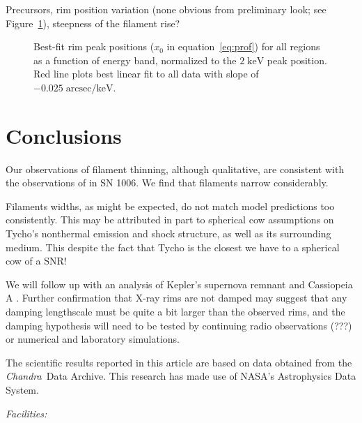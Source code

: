 \documentclass[iop, apj, numberedappendix, twocolappendix]{emulateapj}
\newcommand*{\mt}{\mathrm}
\newcommand*{\unit}[1]{\;\mt{#1}}  %
\newcommand*{\Chandra}{\textit{Chandra}\ }
\begin{document}
Precursors, rim position variation (none obvious from preliminary look; see
Figure~\ref{fig:peak-pos}), steepness of the filament rise?

\begin{figure}[ht]
    \centering
    \caption{Best-fit rim peak positions ($x_0$ in equation~\eqref{eq:prof})
        for all regions as a function of energy band, normalized to the $2
        \unit{keV}$ peak position.  Red line plots best linear fit to all data
        with slope of $-0.025 \unit{arcsec/keV}$.
        \label{fig:peak-pos}}
\end{figure}

\section{Conclusions}

Our observations of filament thinning, although qualitative, are consistent
with the observations of \citet{ressler2014} in SN 1006.
We find that filaments narrow considerably.

Filaments widths, as might be expected, do not match model predictions too
consistently.  This may be attributed in part to spherical cow assumptions on
Tycho's nonthermal emission and shock structure, as well as its surrounding
medium.  This despite the fact that Tycho is the closest we have to a spherical
cow of a SNR!

We will follow up with an analysis of Kepler's supernova remnant and
Cassiopeia A \citep[see][]{araya2010}.  Further confirmation that X-ray rims
are not damped may suggest that any damping lengthscale must be quite a bit
larger than the observed rims, and the damping hypothesis will need to be
tested by continuing radio observations (???) or numerical and laboratory
simulations.

\acknowledgments

The scientific results reported in this article are based on data obtained from
the \Chandra Data Archive.
This research has made use of NASA's Astrophysics Data System.

{\it Facilities:} 

\clearpage
\end{document}
